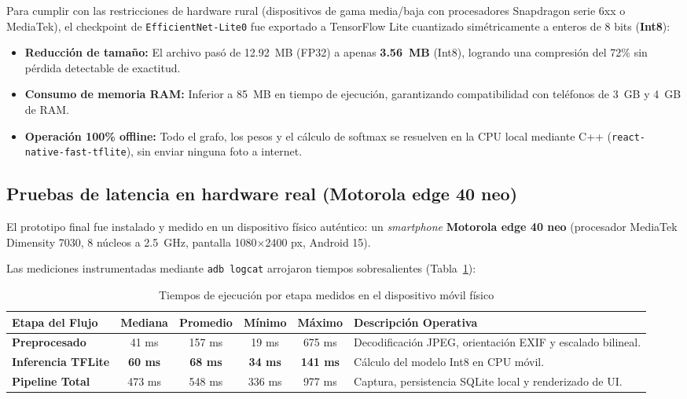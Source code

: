 \documentclass[12pt,letterpaper]{article}
\begin{document}
Para cumplir con las restricciones de hardware rural (dispositivos de gama media/baja con procesadores Snapdragon serie 6xx o MediaTek), el checkpoint de \texttt{EfficientNet-Lite0} fue exportado a TensorFlow Lite cuantizado sim\'etricamente a enteros de 8 bits (\textbf{Int8}):
\begin{itemize}
\item \textbf{Reducci\'on de tama\~no:} El archivo pas\'o de 12.92~MB (FP32) a apenas \textbf{3.56~MB} (Int8), logrando una compresi\'on del 72\% sin p\'erdida detectable de exactitud.
\item \textbf{Consumo de memoria RAM:} Inferior a 85~MB en tiempo de ejecuci\'on, garantizando compatibilidad con tel\'efonos de 3~GB y 4~GB de RAM.
\item \textbf{Operaci\'on 100\% offline:} Todo el grafo, los pesos y el c\'alculo de softmax se resuelven en la CPU local mediante C++ (\texttt{react-native-fast-tflite}), sin enviar ninguna foto a internet.
\end{itemize}

\subsection{Pruebas de latencia en hardware real (Motorola edge 40 neo)}

El prototipo final fue instalado y medido en un dispositivo f\'isico aut\'entico: un \textit{smartphone} \textbf{Motorola edge 40 neo} (procesador MediaTek Dimensity 7030, 8 n\'ucleos a 2.5~GHz, pantalla 1080$\times$2400 px, Android 15).

Las mediciones instrumentadas mediante \texttt{adb logcat} arrojaron tiempos sobresalientes (Tabla~\ref{tab:mobile_latencies}):

\begin{table}[H]
\caption{Tiempos de ejecuci\'on por etapa medidos en el dispositivo m\'ovil f\'isico}
\label{tab:mobile_latencies}
\centering
\small
\begin{singlespace}
\begin{tabular}{lccccp{5.0cm}}
\toprule
\textbf{Etapa del Flujo} & \textbf{Mediana} & \textbf{Promedio} & \textbf{M\'inimo} & \textbf{M\'aximo} & \textbf{Descripci\'on Operativa} \\
\midrule
\textbf{Preprocesado} & 41 ms & 157 ms & 19 ms & 675 ms & Decodificaci\'on JPEG, orientaci\'on EXIF y escalado bilineal. \\
\textbf{Inferencia TFLite} & \textbf{60 ms} & \textbf{68 ms} & \textbf{34 ms} & \textbf{141 ms} & C\'alculo del modelo Int8 en CPU m\'ovil. \\
\textbf{Pipeline Total} & 473 ms & 548 ms & 336 ms & 977 ms & Captura, persistencia SQLite local y renderizado de UI. \\
\bottomrule
\end{tabular}
\end{singlespace}
\end{table}
\end{document}
